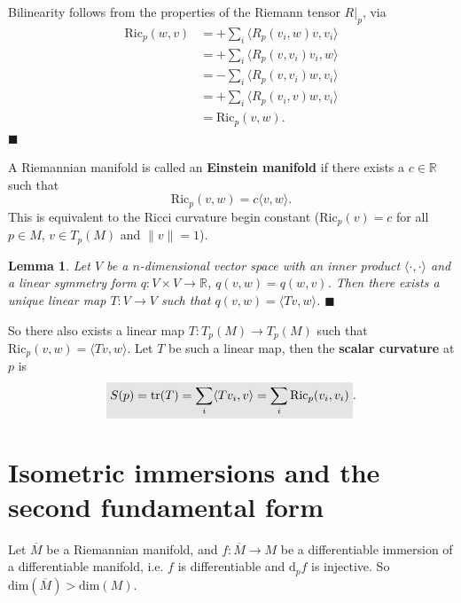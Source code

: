 \documentclass[letter-paper]{tufte-book}
\newtheorem{lemma}[theorem]{\color{pastel-blue}Lemma}
\newenvironment{proof}[1][Proof]{\begin{trivlist}
\item[\hskip \labelsep {\bfseries #1}]}{\end{trivlist}}
\newcommand{\qed}{\hfill$\blacksquare$}
\newcommand{\highlight}[1]{\mathchoice%
  {\colorbox{black!10}{$\displaystyle#1$}}%
  {\colorbox{black!10}{$\textstyle#1$}}%
  {\colorbox{black!10}{$\scriptstyle#1$}}%
  {\colorbox{black!10}{$\scriptscriptstyle#1$}}}%
\begin{document}
\begin{proof}
  Bilinearity follows from the properties of the Riemann tensor $R|_p$, via
  \begin{align*}
    \mbox{Ric}_p(w,v)
      &= +\sum_i \langle R_p(v_i, w)v, v_i\rangle\\
      &= +\sum_i \langle R_p(v, v_i)v_i, w\rangle\\
      &= -\sum_i \langle R_p(v, v_i)w, v_i\rangle\\
      &= +\sum_i \langle R_p(v_i, v)w, v_i\rangle\\
      &= \mbox{Ric}_p(v,w).
  \end{align*}
  \qed
\end{proof}

A Riemannian manifold is called an \textbf{Einstein manifold} if there exists a $c\in\mathbb{R}$ such that
\begin{equation}
  \mbox{Ric}_p(v,w) = c\langle v,w\rangle.
\end{equation}
This is equivalent to the Ricci curvature begin constant ($\mbox{Ric}_p(v) = c$ for all $p\in M$, $v\in T_p(M)$ and $\|v\|=1$).

\begin{lemma}\label{lem:lin-algebra}
  Let $V$ be a $n$-dimensional vector space with an inner product $\langle\cdot,\cdot\rangle$ and a linear symmetry form $q: V\times V\to\mathbb{R}$, $q(v,w) = q(w,v)$. Then there exists a unique linear map $T: V\to V$ such that $q(v,w) = \langle Tv, w\rangle$. \qed
\end{lemma}

So there also exists a linear map $T: T_p(M)\to T_p(M)$ such that $\mbox{Ric}_p(v,w) =\langle Tv,w\rangle$. Let $T$ be such a linear map, then the \textbf{scalar curvature} at $p$ is
\begin{equation}
  \highlight{S(p) = \mbox{tr}(T) = \sum_i \langle Tv_i,v\rangle = \sum_i \mbox{Ric}_p(v_i, v_i)}.
\end{equation}


\section{Isometric immersions and the second fundamental form}

Let $\overline{M}$ be a Riemannian manifold, and $f: \overline{M} \to M$ be a differentiable immersion of a differentiable manifold, i.e. $f$ is differentiable and $\mathrm{d}_p f$ is injective. So $\mbox{dim}(\overline{M}) > \mbox{dim}(M)$.
\end{document}
